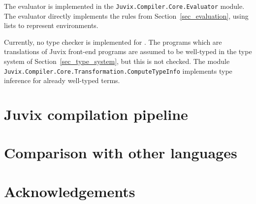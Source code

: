 \documentclass[
    9pt,            %
    techreport,        %
    affiltop,       %
]{art}
\begin{document}
The \JuvixCore{} evaluator is implemented in the \texttt{Juvix.Compiler.Core.Evaluator} module. The evaluator directly implements the rules from Section~\ref{sec_evaluation}, using lists to represent environments. 

Currently, no type checker is implemented for \JuvixCore{}. The \JuvixCore{} programs which are translations of Juvix front-end programs are assumed to be well-typed in the type system of Section~\ref{sec_type_system}, but this is not checked. The module \texttt{Juvix.Compiler.Core.Transformation.ComputeTypeInfo} implements type inference for already well-typed terms.

\section{Juvix compilation pipeline}\label{sec_pipeline}



\section{Comparison with other languages}\label{sec_comparison}



\section*{Acknowledgements}


\nocite{*}

\end{document}
